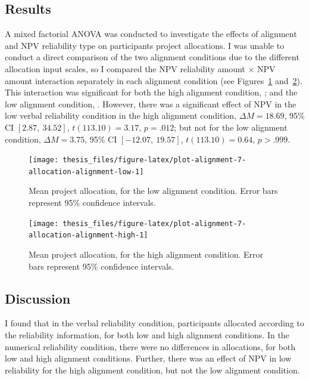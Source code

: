 \documentclass[a4paper, nobind, dvipsnames]{templates/ociamthesis}
\theoremstyle{definition}
\theoremstyle{definition}
\theoremstyle{definition}
\theoremstyle{definition}
\theoremstyle{remark}
\begin{document}
\hypertarget{results-10}{%
\subsection{Results}\label{results-10}}

A mixed factorial ANOVA was conducted to investigate the effects of alignment
and NPV reliability type on participants project allocations. I was unable to
conduct a direct comparison of the two alignment conditions due to the different
allocation input scales, so I compared the NPV reliability amount \(\times\) NPV
amount interaction separately in each alignment condition (see
Figures~\ref{fig:plot-alignment-7-allocation-alignment-low}
and~\ref{fig:plot-alignment-7-allocation-alignment-high}). This interaction was
significant for both the high alignment condition,
;
and the low alignment condition,
.
However, there was a significant effect of NPV in the low verbal reliability
condition in the high alignment condition,
\(\Delta M = 18.69\), 95\% CI \([2.87,~34.52]\), \(t(113.10) = 3.17\), \(p = .012\); but not
for the low alignment condition,
\(\Delta M = 3.75\), 95\% CI \([-12.07,~19.57]\), \(t(113.10) = 0.64\), \(p > .999\).



\begin{figure}
\texttt{[image: thesis\_files/figure-latex/plot-alignment-7-allocation-alignment-low-1]} \caption{Mean project allocation, for the low alignment condition. Error bars represent 95\% confidence intervals.}\label{fig:plot-alignment-7-allocation-alignment-low}
\end{figure}



\begin{figure}
\texttt{[image: thesis\_files/figure-latex/plot-alignment-7-allocation-alignment-high-1]} \caption{Mean project allocation, for the high alignment condition. Error bars represent 95\% confidence intervals.}\label{fig:plot-alignment-7-allocation-alignment-high}
\end{figure}

\hypertarget{discussion-13}{%
\subsection{Discussion}\label{discussion-13}}

I found that in the verbal reliability condition, participants allocated
according to the reliability information, for both low and high alignment
conditions. In the numerical reliability condition, there were no differences in
allocations, for both low and high alignment conditions. Further, there was an
effect of NPV in low reliability for the high alignment condition, but not the
low alignment condition.
\end{document}
